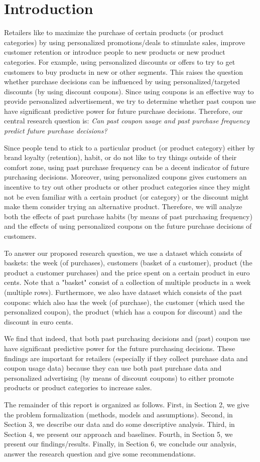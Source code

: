 \section{Introduction}
Retailers like to maximize the purchase of certain products (or product
categories) by using personalized promotions/deals to stimulate sales, improve
customer retention or introduce people to new products or new product
categories. For example, using personalized discounts or offers to try to get
customers to buy products in new or other segments. This raises the question
whether purchase decisions can be influenced by using personalized/targeted
discounts (by using discount coupons). Since using coupons is an effective way
to provide personalized advertisement, we try to determine whether past coupon
use have significant predictive power for future purchase decisions. Therefore,
our central research question is: \textit{Can past coupon usage and past
purchase frequency predict future purchase decisions?}

Since people tend to stick to a particular product (or product category) either
by brand loyalty (retention), habit, or do not like to try things outside of
their comfort zone, using past purchase frequency can be a decent indicator of
future purchasing decisions. Moreover, using personalized coupons gives
customers an incentive to try out other products or other product categories
since they might not be even familiar with a certain product (or category) or
the discount might make them consider trying an alternative product. Therefore,
we will analyze both the effects of past purchase habits (by means of past
purchasing frequency) and the effects of using personalized coupons on the
future purchase decisions of customers.

To answer our proposed research question, we use a dataset which consists of
baskets: the week (of purchases), customers (basket of a customer), product (the product
a customer purchases) and the price spent on a certain product in euro cents.
Note that a "basket" consist of a collection of multiple products in a week
(multiple rows). Furthermore, we also have dataset which consists of the past
coupons: which also has the week (of purchase), the customer (which used the
personalized coupon), the product (which has a coupon for discount) and the
discount in euro cents.

We find that indeed, that both past purchasing decisions and (past) coupon use
have significant predictive power for the future purchasing decisions. These
findings are important for retailers (especially if they collect purchase data and
coupon usage data) because they can use both past purchase data and personalized
advertising (by means of discount coupons) to either promote products or product
categories to increase sales.

The remainder of this report is organized as follows. First, in Section 2, we
give the problem formalization (methods, models and assumptions). 
Second, in Section 3, we describe our data and do some descriptive analysis. 
Third, in Section 4, we present our approach and baselines. Fourth, in Section 5, 
we present our findings/results. Finally, in Section 6, we conclude our
analysis, answer the research question and give some recommendations.
